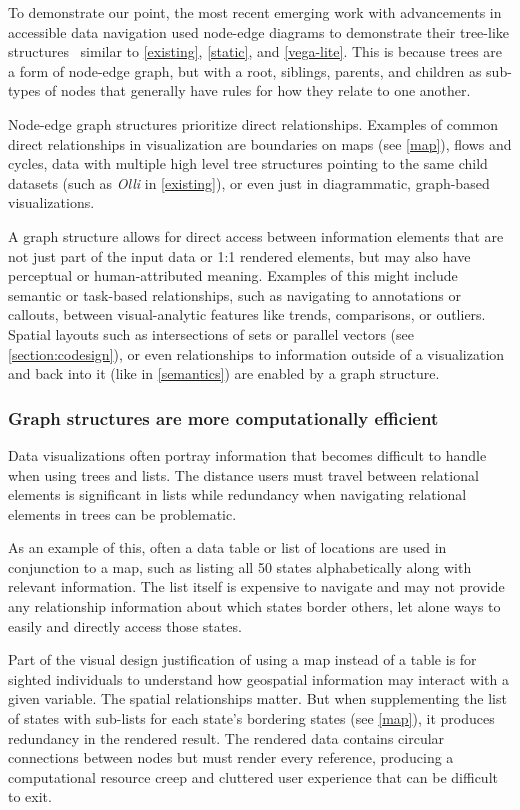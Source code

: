 \documentclass[journal]{vgtc}                %
\begin{document}
To demonstrate our point, the most recent emerging work with advancements in accessible data navigation used node-edge diagrams to demonstrate their tree-like structures~\cite{Zong2022Rich, Thompson2023Chart} similar to \autoref{existing}, \autoref{static}, and \autoref{vega-lite}. This is because trees are a form of node-edge graph, but with a root, siblings, parents, and children as sub-types of nodes that generally have rules for how they relate to one another. 

Node-edge graph structures prioritize direct relationships. Examples of common direct relationships in visualization are boundaries on maps (see \autoref{map}), flows and cycles, data with multiple high level tree structures pointing to the same child datasets (such as \textit{Olli} in \autoref{existing}), or even just in diagrammatic, graph-based visualizations.

A graph structure allows for direct access between information elements that are not just part of the input data or 1:1 rendered elements, but may also have perceptual or human-attributed meaning. Examples of this might include semantic or task-based relationships, such as navigating to annotations or callouts, between visual-analytic features like trends, comparisons, or outliers. Spatial layouts such as intersections of sets or parallel vectors (see \autoref{section:codesign}), or even relationships to information outside of a visualization and back into it (like in \autoref{semantics}) are enabled by a graph structure.

\subsubsection{Graph structures are more computationally efficient}

Data visualizations often portray information that becomes difficult to handle when using trees and lists. The distance users must travel between relational elements is significant in lists while redundancy when navigating relational elements in trees can be problematic.

As an example of this, often a data table or list of locations are used in conjunction to a map, such as listing all 50 states alphabetically along with relevant information. The list itself is expensive to navigate and may not provide any relationship information about which states border others, let alone ways to easily and directly access those states.

Part of the visual design justification of using a map instead of a table is for sighted individuals to understand how geospatial information may interact with a given variable. The spatial relationships matter. But when supplementing the list of states with sub-lists for each state's bordering states (see \autoref{map}), it produces redundancy in the rendered result. The rendered data contains circular connections between nodes but must render every reference, producing a computational resource creep and cluttered user experience that can be difficult to exit.
\end{document}
